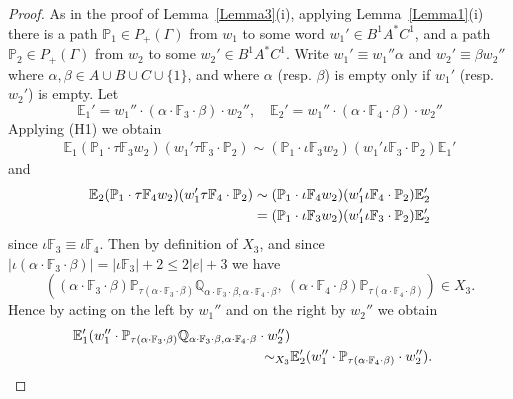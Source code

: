 \documentclass[11pt]{amsart}
\theoremstyle{plain}
\begin{document}
\begin{proof}
As in the proof of Lemma~\ref{Lemma3}(i), applying Lemma~\ref{Lemma1}(i) there is a path ${\mathbb{P}}_1 \in P_+(\Gamma)$ from $w_1$ to some word $w_1' \in B^1 A^* C^1$, and a path ${\mathbb{P}}_2 \in P_+(\Gamma)$ from $w_2$ to some $w_2' \in B^1 A^* C^1$. Write $w_1' \equiv w_1'' \alpha$ and $w_2' \equiv \beta w_2''$ where $\alpha, \beta \in A \cup B \cup C \cup \{1 \}$, and where $\alpha$ (resp. $\beta$) is empty only if $w_1'$ (resp. $w_2'$) is empty. Let
\[
{\mathbb{E}}_1' = w_1'' \cdot (\alpha \cdot {\mathbb{F}}_3 \cdot \beta) \cdot w_2'', \quad
{\mathbb{E}}_2' = w_1'' \cdot (\alpha \cdot {\mathbb{F}}_4 \cdot \beta) \cdot w_2'' 
\]
Applying (H1) we obtain
\begin{align}
{\mathbb{E}}_1 ({\mathbb{P}}_1 \cdot \tau {\mathbb{F}}_3 w_2)
(w_1' \tau {\mathbb{F}}_3 \cdot {\mathbb{P}}_2) 
 \sim 
({\mathbb{P}}_1 \cdot \iota {\mathbb{F}}_3 w_2) 
(w_1' \iota {\mathbb{F}}_3 \cdot {\mathbb{P}}_2) {\mathbb{E}}_1' \label{first}
\end{align}
and
\begin{align}
{\mathbb{E}}_2 ({\mathbb{P}}_1 \cdot \tau {\mathbb{F}}_4 w_2)
(w_1' \tau {\mathbb{F}}_4 \cdot {\mathbb{P}}_2) 
 \sim 
({\mathbb{P}}_1 \cdot \iota {\mathbb{F}}_4 w_2) 
(w_1' \iota {\mathbb{F}}_4 \cdot {\mathbb{P}}_2) {\mathbb{E}}_2' \label{second} \\
 =  ({\mathbb{P}}_1 \cdot \iota {\mathbb{F}}_3 w_2) 
(w_1' \iota {\mathbb{F}}_3 \cdot {\mathbb{P}}_2) {\mathbb{E}}_2' \notag
\end{align}
since $\iota {\mathbb{F}}_3 \equiv \iota {\mathbb{F}}_4$. Then by definition of $X_3$, and since $|\iota(\alpha \cdot {\mathbb{F}}_3 \cdot \beta)| = |\iota {\mathbb{F}}_3| + 2 \leq 2|e| + 3$ we have
\[
(
(\alpha \cdot {\mathbb{F}}_3 \cdot \beta)
{\mathbb{P}}_{\tau(\alpha \cdot {\mathbb{F}}_3 \cdot \beta)} {\mathbb{Q}}_{\alpha \cdot {\mathbb{F}}_3 \cdot \beta, \alpha \cdot {\mathbb{F}}_4 \cdot \beta}, \
(\alpha \cdot {\mathbb{F}}_4 \cdot \beta)
{\mathbb{P}}_{\tau(\alpha \cdot {\mathbb{F}}_4 \cdot \beta)}
) \in X_3.
\]
Hence by acting on the left by $w_1''$ and on the right by $w_2''$ we obtain
\begin{align}
 \notag {\mathbb{E}}_1' (w_1'' \cdot {\mathbb{P}}_{\tau(\alpha \cdot {\mathbb{F}}_3 \cdot \beta)}
{\mathbb{Q}}_{\alpha \cdot {\mathbb{F}}_3 \cdot \beta, \alpha \cdot {\mathbb{F}}_4 \cdot \beta} \cdot w_2'') \\ \sim_{X_3} &
{\mathbb{E}}_2' (w_1'' \cdot {\mathbb{P}}_{\tau(\alpha \cdot {\mathbb{F}}_4 \cdot \beta)} \cdot w_2''). \label{third}
\end{align}

\end{proof}
\end{document}
